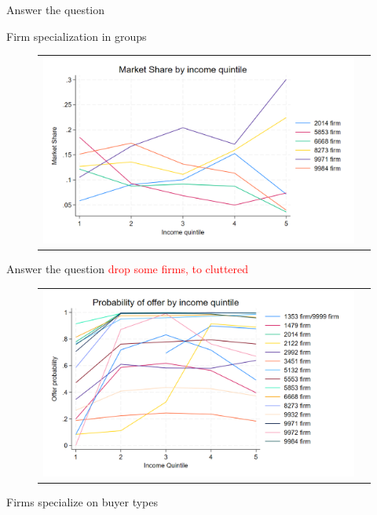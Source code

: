 \documentclass[notes, 10pt,aspectratio=169]{beamer}
\begin{document}





\begin{frame}{Answer the question}\label{slide:fig1}    

Firm specialization in groups
\begin{figure}[H]
\centering{}%
\begin{tabular}{cc}
\includegraphics[scale=0.27]{../figures/IE3_supply_income_quintile.png}
\end{tabular}
\end{figure}
\end{frame}


\begin{frame}{Answer the question}\label{slide:fig2}    
\textcolor{red}{drop some firms, to cluttered}

\begin{figure}[H]
\caption{}
\centering{}%
\begin{tabular}{cc}
\includegraphics[scale=0.24]{../figures/IE3_supply_offerprob_income_q.png}
\end{tabular}
\end{figure}

Firms specialize on buyer types
\end{frame}

 
\end{document}
